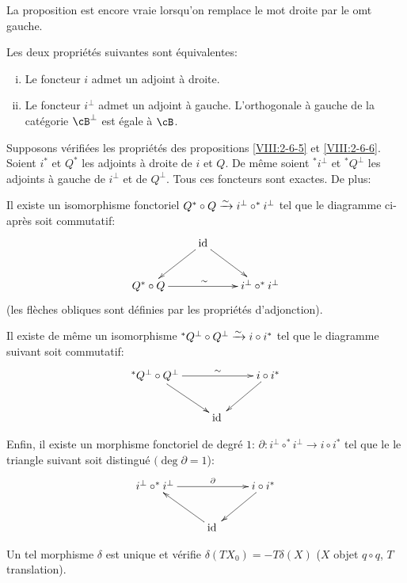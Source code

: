 La proposition est encore vraie lorsqu'on remplace le mot droite par le omt 
gauche. 





\begin{proposition}\label{VIII:2-6-6}
Les deux propriétés suivantes sont équivalentes: 
\begin{enumerate}[(i)]
  \item Le foncteur $i$ admet un adjoint à droite. 
  \item Le foncteur $i^\bot$ admet un adjoint à gauche. L'orthogonale à 
    gauche de la catégorie $\cB^\bot$ est égale à $\cB$. 
\end{enumerate}
\end{proposition}





\begin{proposition}\label{VIII:2-6-7}
Supposons vérifiées les propriétés des propositions \ref{VIII:2-6-5} et 
\ref{VIII:2-6-6}. Soient $i^\ast$ et $Q^\ast$ les adjoints à droite de $i$ et 
$Q$. De même soient $^\ast i^\bot$ et $^\ast Q^\bot$ les adjoints à gauche 
de $i^\bot$ et de $Q^\bot$. Tous ces foncteurs sont exactes. De plus: 

Il existe un isomorphisme fonctoriel 
$Q^\ast\circ Q\xrightarrow\sim i^\bot\circ ^\ast i^\bot$ tel que le diagramme ci-après 
soit commutatif: 
\[\xymatrix{
  & \operatorname{id} \ar[dl] \ar[dr] \\
  Q^\ast \circ Q \ar[rr]^\sim 
    & & i^\bot\circ ^\ast i^\bot 
}\]
(les flèches obliques sont définies par les propriétés d'adjonction).

Il existe de même un isomorphisme 
$^\ast Q^\bot \circ Q^\bot \xrightarrow\sim i\circ i^\ast$ tel que le diagramme suivant soit 
commutatif: 
\[\xymatrix{
  ^\ast Q^\bot\circ Q^\bot \ar[rr]^-\sim \ar[dr] 
    & & i\circ i^\ast \ar[dl] \\
  & \operatorname{id}{}
}\]

Enfin, il existe un morphisme fonctoriel de degré $1$: 
$\partial:i^\bot\circ ^\ast i^\bot \to i\circ i^\ast$ tel que le le triangle 
suivant soit distingué $(\deg\partial=1$): 
\[\xymatrix{
  i^\bot \circ ^\ast i^\bot \ar[rr]^-\partial 
    & & i\circ i^\ast \ar[dl] \\
  & \operatorname{id}{} \ar[ul] 
}\]

Un tel morphisme $\delta$ est unique et vérifie 
$\delta(T X_0) = - T \delta(X)$ ($X$ objet $q\circ q$, $T$ translation). 
\end{proposition}















